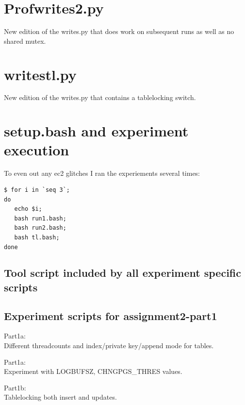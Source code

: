 \section{Profwrites2.py}\label{app:prof}
New edition of the writes.py that does work on subsequent runs as well as no
shared mutex.


\section{writestl.py}\label{app:tl}
New edition of the writes.py that contains a tablelocking switch.


\section{setup.bash and experiment execution}\label{app:setup}
To even out any ec2 glitches I ran the experiements several times:
\begin{verbatim}
$ for i in `seq 3`; 
do 
   echo $i; 
   bash run1.bash; 
   bash run2.bash; 
   bash tl.bash; 
done
\end{verbatim}

\subsection{Tool script included by all experiment specific scripts}


\subsection{Experiment scripts for assignment2-part1}

Part1a:\\
Different threadcounts and index/private key/append mode for tables.

Part1a:\\
Experiment with LOGBUFSZ, CHNGPGS\_THRES values.

Part1b:\\
Tablelocking both insert and updates.



